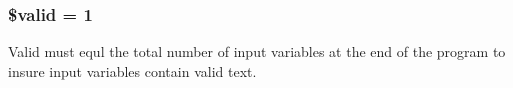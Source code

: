 \hypertarget{rmRooms_8php_a0587674d27d00ef497e08e53ccf45bbb}{
\subsubsection[{\$valid}]{\setlength{\rightskip}{0pt plus 5cm}\$valid = 1}}\label{rmRooms_8php_a0587674d27d00ef497e08e53ccf45bbb}
\-Valid must equl the total number of input variables at the end of the program to insure input variables contain valid text. 
